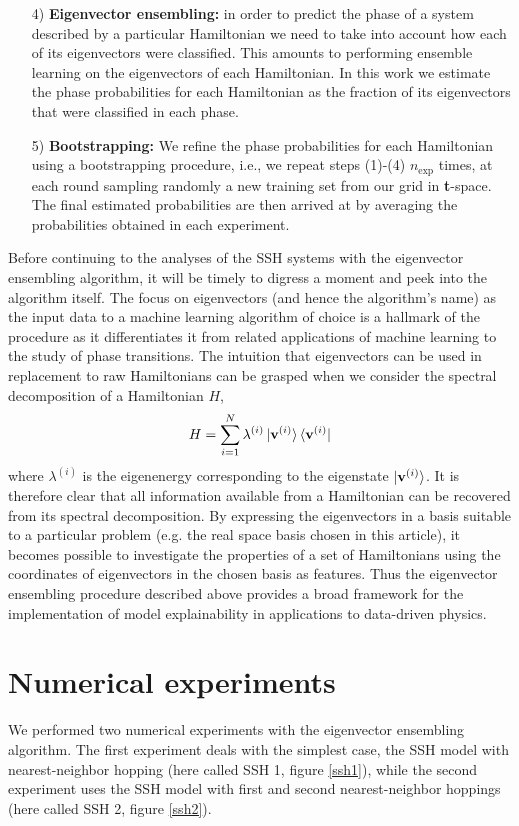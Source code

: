 \documentclass[10pt]{revtex4-1}
\begin{document}
\begin{enumerate}
\item[4)]\textbf{Eigenvector ensembling:} in order to predict the phase of a system described by a particular Hamiltonian we need to take into account how each of its eigenvectors were classified. This amounts to performing ensemble learning on the eigenvectors of each Hamiltonian. In this work we estimate the phase probabilities for each Hamiltonian as the fraction of its eigenvectors that were classified in each phase.
\item[5)] \textbf{Bootstrapping:} We refine the phase probabilities for each Hamiltonian using a bootstrapping procedure, i.e., we repeat steps (1)-(4) $n_\text{exp}$ times, at each round sampling randomly a new training set from our grid in \textbf{t}-space. The final estimated probabilities are then arrived at by averaging the probabilities obtained in each experiment.
\end{enumerate} 

\vspace{.3cm}
Before continuing to the analyses of the SSH systems with the eigenvector ensembling algorithm, it will be timely to digress a moment and peek into the algorithm itself. The focus on eigenvectors (and hence the algorithm's name) as the input data to a machine learning algorithm of choice is a hallmark of the procedure as it differentiates it from related applications of machine learning to the study of phase transitions. The intuition that eigenvectors can be used in replacement to raw Hamiltonians can be grasped when we consider the spectral decomposition of a Hamiltonian $H$,    
\begin{equation}
\label{eigen_decomposition}
H = \sum_{i=1}^{N}\lambda^{(i)} \ket{\mathbf{v}^{(i)}}\bra{\mathbf{v}^{(i)}}
\end{equation}
where $\lambda^{(i)}$ is the eigenenergy corresponding to the eigenstate $\ket{\mathbf{v}^{(i)}}$. It is therefore clear that all information available from a Hamiltonian can be recovered from its spectral decomposition. By expressing the eigenvectors in a basis suitable to a particular problem (e.g. the real space basis chosen in this article), it becomes possible to investigate the properties of a set of Hamiltonians using the coordinates of eigenvectors in the chosen basis as features. Thus the eigenvector ensembling procedure described above provides a broad framework for the implementation of model explainability in applications to data-driven physics. 

\section{Numerical experiments}
\label{numerical_experiments}
We performed two numerical experiments with the eigenvector ensembling algorithm. The first experiment deals with the simplest case, the SSH model with nearest-neighbor hopping (here called SSH 1, figure \ref{ssh1}), while the second experiment uses the SSH model with first and second nearest-neighbor hoppings (here called SSH 2, figure \ref{ssh2}).
\end{document}
